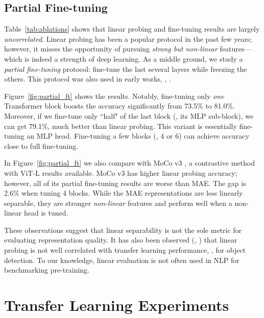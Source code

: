 \documentclass[10pt,twocolumn,letterpaper]{article}
\begin{document}
\subsection{Partial Fine-tuning}
\label{sec:partial_ft}

Table~\ref{tab:ablations} shows that linear probing and fine-tuning results are largely \textit{uncorrelated}. Linear probing has been a popular protocol in the past few years; however, it misses the opportunity of pursuing \textit{strong but non-linear} features---which is indeed a strength of deep learning. As a middle ground, we study a \textit{partial fine-tuning} protocol: fine-tune the last several layers while freezing the others. This protocol was also used in early works, \eg, \cite{Yosinski2014,Zhang2016,Noroozi2016}.

Figure~\ref{fig:partial_ft} shows the results. Notably, fine-tuning only \textit{one} Transformer block boosts the accuracy significantly from 73.5\% to 81.0\%. Moreover, if we fine-tune only ``half" of the last block (\ie, its MLP sub-block), we can get 79.1\%, much better than linear probing. This variant is essentially fine-tuning an MLP head. Fine-tuning a few blocks (\eg, 4 or 6) can achieve accuracy close to full fine-tuning.

In Figure~\ref{fig:partial_ft} we also compare with MoCo v3 \cite{Chen2021a}, a contrastive method with ViT-L results available. MoCo v3 has higher linear probing accuracy; however, all of its partial fine-tuning results are worse than MAE. The gap is 2.6\% when tuning 4 blocks. While the MAE representations are less linearly separable, they are stronger \textit{non-linear} features and perform well when a non-linear head is tuned.

These observations suggest that linear separability is not the sole metric for evaluating representation quality. It has also been observed (\eg, \cite{Chen2021}) that linear probing is not well \mbox{correlated} with transfer learning performance, \eg, for object detection. To our knowledge, linear evaluation is not often used in NLP for benchmarking pre-training.

\section{Transfer Learning Experiments}\label{sec:transfer}
\end{document}
